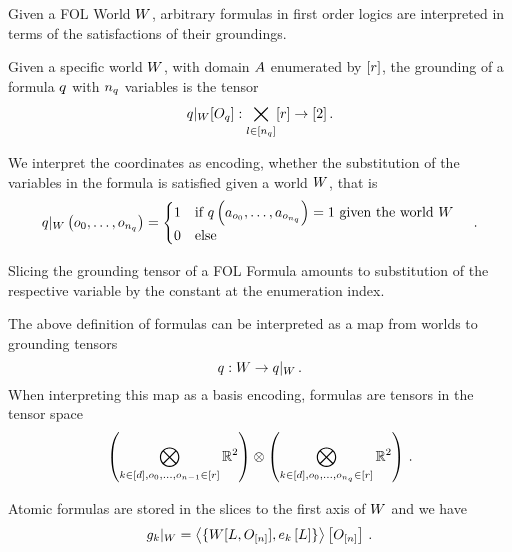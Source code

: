 Given a FOL World $W$, arbitrary formulas in first order logics are interpreted in terms of the satisfactions of their groundings.

\begin{definition}
	Given a specific world $W$, with domain $A$ enumerated by $[r]$, the grounding of a formula $q$ with $n_{q}$ variables is the tensor
		\[ {q}|_{W}[O_{q}] :  \bigtimes_{l\in[n_{q}]} [r] \rightarrow [2] \, . \]
	
	We interpret the coordinates as encoding, whether the substitution of the variables in the formula is satisfied given a world $W$, that is
	\begin{align*}
		{q}|_{W} \left(o_{0},\ldots,o_{n_{q}}\right) = 
			\begin{cases}
				1 \quad \text{if $q\left(a_{o_{0}},\ldots,a_{o_{n_{q}}}\right)=1$ given the world $W$}  \\
				0 \quad \text{else}
			\end{cases} \, . 
	\end{align*}
\end{definition}


Slicing the grounding tensor of a FOL Formula amounts to substitution of the respective variable by the constant at the enumeration index.


The above definition of formulas can be interpreted as a map from worlds to grounding tensors
	\[ q : W \rightarrow {q}|_{W} \, . \]
When interpreting this map as a basis encoding, formulas are tensors in the tensor space 
\begin{align*}
 	\left(\bigotimes_{k\in[d], o_{0},\ldots,o_{n-1}\in[r]} \mathbb{R}^{2} \right) \otimes 
	\left(  \bigotimes_{k\in[d], o_{0},\ldots,o_{n_{q}}\in[r]} \mathbb{R}^{2} \right) \, . 
\end{align*}




Atomic formulas are stored in the slices to the first axis of $W$ and we have
\begin{align}
	{g_{k}}|_{W} = 
	\left\langle \{W[L,O_{[n]}], e_{k}\left[L\right]\}\right\rangle \left[ O_{[n]} \right] \, . 
\end{align}




